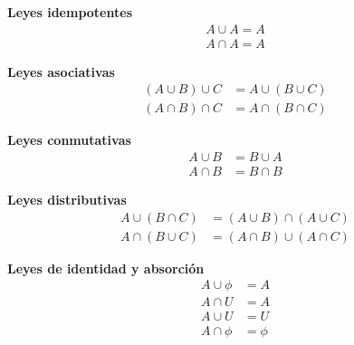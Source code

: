 \documentclass{article}
\begin{document}
    \begin{multicols}{2}

        \textbf{Leyes idempotentes}
        \begin{subequations}
            \begin{align}
                A \cup A = A\\
                A \cap A = A
            \end{align}
        \end{subequations}

        \textbf{Leyes asociativas}
        \begin{subequations}
            \begin{align}
                (A \cup B) \cup C &= A \cup (B \cup C)\\
                (A \cap B) \cap C &= A \cap (B \cap C)
            \end{align}
        \end{subequations}

        \textbf{Leyes conmutativas}
        \begin{subequations}
            \begin{align}
                A \cup B &= B \cup A\\
                A \cap B &= B \cap B
            \end{align}
        \end{subequations}

        \textbf{Leyes distributivas}
        \begin{subequations}
            \begin{align}
                A \cup (B \cap C) &= (A \cup B) \cap (A \cup C)\\
                A \cap (B \cup C) &= (A \cap B) \cup (A \cap C)
            \end{align}
        \end{subequations}

        \textbf{Leyes de identidad y absorción}
        \begin{subequations}
            \begin{align}
                A \cup \phi &= A\\
                A \cap U &= A \\
                A \cup U &= U\\
                A \cap \phi &= \phi
            \end{align}
        \end{subequations}


\end{multicols}
\end{document}
